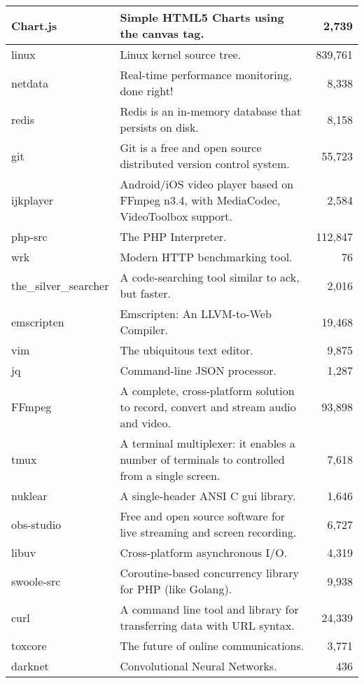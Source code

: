 \begin{table*}[htbp]
\begin{tabular}{@{}lp{13cm}r@{}}
Chart.js & Simple HTML5 Charts using the canvas tag. & 2,739 \\
\midrule
linux & Linux kernel source tree. & 839,761 \\
netdata & Real-time performance monitoring, done right! & 8,338 \\
redis & Redis is an in-memory database that persists on disk. & 8,158 \\
git & Git is a free and open source distributed version control system. & 55,723 \\
ijkplayer & Android/iOS video player based on FFmpeg n3.4, with MediaCodec, VideoToolbox support. & 2,584 \\
php-src & The PHP Interpreter. & 112,847 \\
wrk & Modern HTTP benchmarking tool. & 76 \\
the\_silver\_searcher & A code-searching tool similar to ack, but faster. & 2,016 \\
emscripten & Emscripten: An LLVM-to-Web Compiler. & 19,468 \\
vim & The ubiquitous text editor. & 9,875 \\
jq & Command-line JSON processor. & 1,287 \\
FFmpeg & A complete, cross-platform solution to record, convert and stream audio and video. & 93,898 \\
tmux & A terminal multiplexer: it enables a number of terminals to controlled from a single screen.  & 7,618 \\
nuklear & A single-header ANSI C gui library. & 1,646 \\
obs-studio & Free and open source software for live streaming and screen recording. & 6,727 \\
libuv & Cross-platform asynchronous I/O. & 4,319 \\
swoole-src & Coroutine-based concurrency library for PHP (like Golang). & 9,938 \\
curl & A command line tool and library for transferring data with URL syntax. & 24,339 \\
toxcore & The future of online communications. & 3,771 \\
darknet & Convolutional Neural Networks. & 436 \\
\bottomrule
\end{tabular}
\end{table*}


